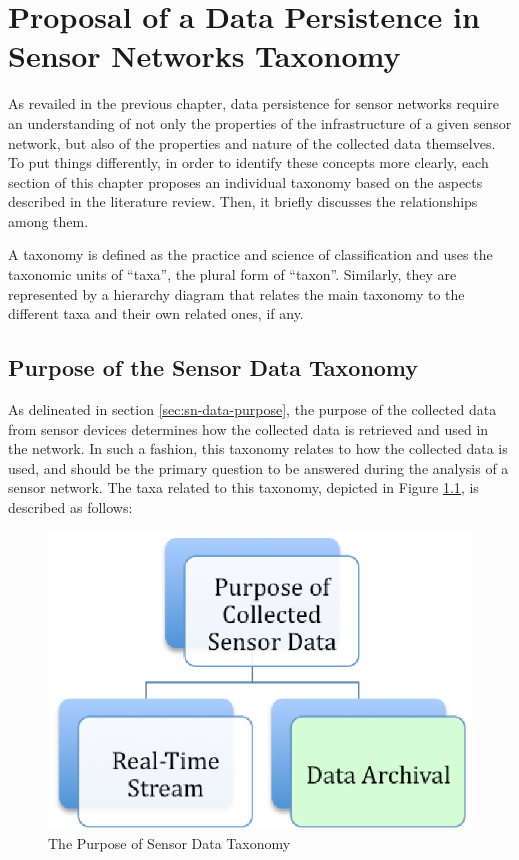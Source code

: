 

\chapter{Proposal of a Data Persistence in Sensor Networks Taxonomy}
\label{chap:taxonomies}

As revailed in the previous chapter, data persistence for sensor
networks require an understanding of not only the properties of the
infrastructure of a given sensor network, but also of the properties and nature
of the collected data themselves. To put things differently, in order to
identify these concepts more clearly, each section of this chapter proposes an
individual taxonomy based on the aspects described in the literature
review. Then, it briefly discusses the relationships among them.

A taxonomy is defined as the practice and science of classification and uses
the taxonomic units of ``taxa'', the plural form of ``taxon''. Similarly, they
are represented by a hierarchy diagram that relates the main taxonomy to the
different taxa and their own related ones, if any.

\section{Purpose of the Sensor Data Taxonomy}

As delineated in section \ref{sec:sn-data-purpose}, the purpose of the
collected data from sensor devices determines how the collected data is
retrieved and used in the network. In such a fashion, this taxonomy relates to
how the collected data is used, and should be the primary question to be
answered during the analysis of a sensor network. The taxa related to this
taxonomy, depicted in Figure \ref{fig:taxonomy-data-purpose}, is described as
follows:

\begin{figure}[h]
  \centering
  \includegraphics{../diagrams/taxonomy-data-purpose}
  \caption{The Purpose of Sensor Data Taxonomy}
  \label{fig:taxonomy-data-purpose}
\end{figure}

